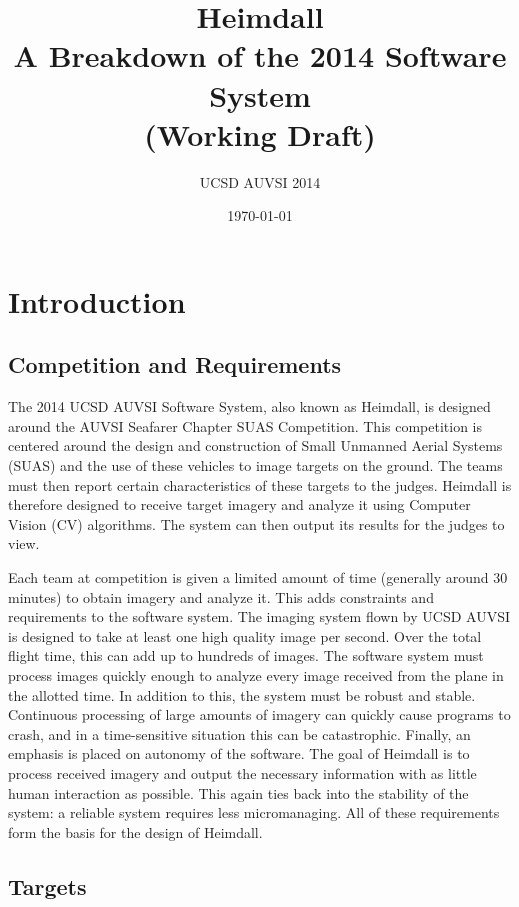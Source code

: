\documentclass{article}
\title{Heimdall \\ \large A Breakdown of the 2014 Software System \\ (Working Draft)}
\author{UCSD AUVSI 2014}
\date{\today}
\begin{document}
\begin{titlepage}
	\maketitle
	\thispagestyle{empty}
\end{titlepage}

\newpage
	\tableofcontents
\newpage
{}

\section{Introduction}
\subsection{Competition and Requirements}

The 2014 UCSD AUVSI Software System, also known as Heimdall, is designed around the AUVSI Seafarer Chapter SUAS Competition. This competition is centered around the design and construction of Small Unmanned Aerial Systems (SUAS) and the use of these vehicles to image targets on the ground. The teams must then report certain characteristics of these targets to the judges. Heimdall is therefore designed to receive target imagery and analyze it using Computer Vision (CV) algorithms. The system can then output its results for the judges to view. 

Each team at competition is given a limited amount of time (generally around 30 minutes) to obtain imagery and analyze it. This adds constraints and requirements to the software system. The imaging system flown by UCSD AUVSI is designed to take at least one high quality image per second. Over the total flight time, this can add up to hundreds of images. The software system must process images quickly enough to analyze every image received from the plane in the allotted time. In addition to this, the system must be robust and stable. Continuous processing of large amounts of imagery can quickly cause programs to crash, and in a time-sensitive situation this can be catastrophic. Finally, an emphasis is placed on autonomy of the software. The goal of Heimdall is to process received imagery and output the necessary information with as little human interaction as possible. This again ties back into the stability of the system: a reliable system requires less micromanaging. All of these requirements form the basis for the design of Heimdall.

\subsection{Targets}
\end{document}

